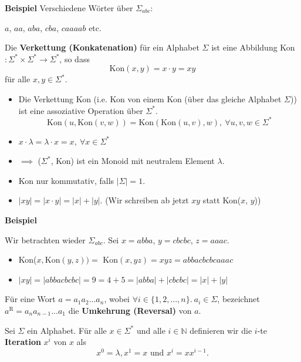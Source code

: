 \documentclass[a4paper, 11pt]{article}
\def\N{\mathbb{N}}
\newcommand\myTitle[1]{{\large \textbf {#1}}}
\begin{document}
	 \myTitle{Beispiel}
	 Verschiedene Wörter über $\Sigma_{abc}$:

	 $a$, $aa$, $aba$, $cba$, $caaaab$ etc.



	
	\begin{mainbox}{}
		Die \textbf{Verkettung (Konkatenation)} für ein Alphabet $\Sigma$ ist eine Abbildung Kon$: \Sigma^* \times \Sigma^* \to \Sigma^*$, so dass 
		$$\text{Kon}(x, y) = x \cdot y = xy$$
		für alle $x, y \in \Sigma^*$.
	\end{mainbox}
	
	\begin{itemize}[label=-]
		\item Die Verkettung Kon (i.e. Kon von einem Kon (über das gleiche Alphabet $\Sigma$)) ist eine assoziative Operation über $\Sigma^*$.
		$$\text{Kon}(u, \text{Kon}(v, w)) = \text{Kon}(\text{Kon}(u, v), w), \ \forall u,v,w \in \Sigma^*$$
		\item $x\cdot \lambda = \lambda \cdot x = x, \ \forall x \in \Sigma^*$
		\item $\implies$ ($\Sigma^*$, Kon) ist ein Monoid mit neutralem Element $\lambda$.
		\item Kon nur kommutativ, falls $|\Sigma| = 1$.
		\item $|xy|=|x\cdot y| = |x|+|y|$. (Wir schreiben ab jetzt $xy$ statt Kon($x$, $y$))
	\end{itemize}



	\myTitle{Beispiel}

	Wir betrachten wieder $\Sigma_{abc}$. Sei $x = abba$, $y = cbcbc$, $z = aaac$.
	\begin{itemize}[label=-]
		\item Kon($x, \text{Kon}(y, z)) = $  $\text{Kon}(x, yz) = xyz = abbacbcbcaaac$
		\item $|xy| =$$ |abbacbcbc| = 9 = 4 + 5 = |abba| + |cbcbc| = |x| + |y|$
	\end{itemize}
	

	



	
	\begin{mainbox}{}
		Für eine Wort $a = a_1a_2...a_n$, wobei $\forall i \in \{1,2, ..., n\}. \ a_i \in \Sigma$, 
		bezeichnet $a^\text{R} = a_na_{n-1}...a_1$ die \textbf{Umkehrung (Reversal)} von $a$.
	\end{mainbox}
	
	\begin{mainbox}{}
		Sei $\Sigma$ ein Alphabet. Für alle $x \in \Sigma^*$ und alle $i \in \N$ definieren wir die $i$-te \textbf{Iteration} $x^i$ von $x$ als 
		$$x^0 = \lambda, x^1 = x \text{ und } x^i = xx^{i-1}.$$
	\end{mainbox}
\end{document}

